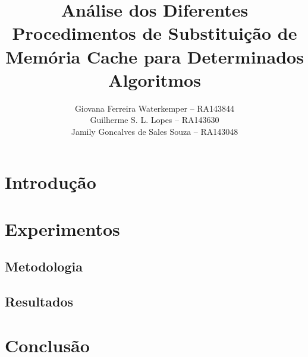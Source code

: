 \documentclass[12pt]{article}
\title{Análise dos Diferentes Procedimentos de Substituição de Memória Cache 
para Determinados Algoritmos}
\author{Giovana Ferreira Waterkemper -- RA143844\\
        Guilherme S. L. Lopes -- RA143630\\
        Jamily Goncalves de Sales Souza -- RA143048
        }
\begin{document}
\maketitle

\begin{resumo}

\end{resumo}

\section{Introdução}

\section{Experimentos}
    \subsection{Metodologia}
    \subsection{Resultados}

\section{Conclusão}

    



\end{document}
